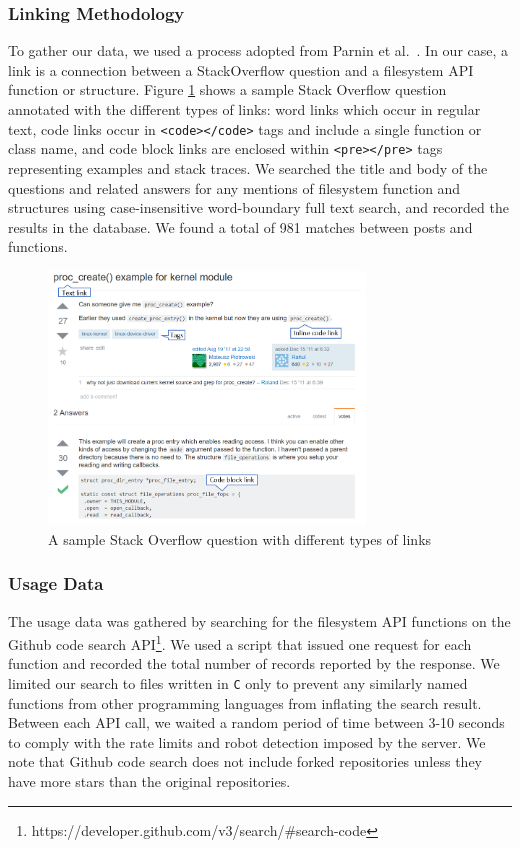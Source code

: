 \subsubsection{Linking Methodology}
To gather our data, we used a process adopted from Parnin et al.~\cite{Parnin2012CrowdDE}.
In our case, a link is a connection between a StackOverflow question and a filesystem API function or structure. Figure \ref{fig:soq} shows a sample Stack Overflow question annotated with the different types of links: word links which occur in regular text, code links occur in \texttt{<code></code>} tags and include a single function or class name, and code block links are enclosed within \texttt{<pre></pre>} tags representing examples and stack traces. We searched the title and body of the questions and related answers for any mentions of filesystem function and structures using case-insensitive word-boundary full text search, and recorded the results in the database. We found a total of 981 matches between posts and functions.

\begin{figure}[t!]
  \includegraphics[width=0.75\textwidth]{images/soquestion-annotated.png}
  \caption{A sample Stack Overflow question with different types of links}
  \label{fig:soq}
\end{figure}

\subsubsection{Usage Data}
The usage data was gathered by searching for the filesystem API functions on the Github code search API\footnote{https://developer.github.com/v3/search/\#search-code}. We used a script that issued one request for each function and recorded the total number of records reported by the response. We limited our search to files written in \texttt{C} only to prevent any similarly named functions from other programming languages from inflating the search result. Between each API call, we waited a random period of time between 3-10 seconds to comply with the rate limits and robot detection imposed by the server. We note that Github code search does not include forked repositories unless they have more stars than the original repositories.

